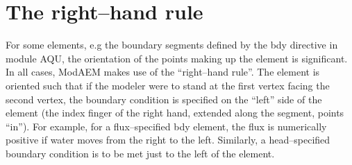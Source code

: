 \section{The right--hand rule\label{sec:The-right--hand-rule}}

For some elements, e.g the boundary segments defined by the \textsf{bdy}
directive in module AQU, the orientation of the points making up the
element is significant. In all cases, ModAEM makes use of the ``right--hand
rule''. The element is oriented such that if the modeler were to
stand at the first vertex facing the second vertex, the boundary condition
is specified on the ``left'' side of the element (the index finger
of the right hand, extended along the segment, points ``in''). For
example, for a flux--specified bdy element, the flux is numerically
positive if water moves from the right to the left. Similarly, a head--specified
boundary condition is to be met just to the left of the element.
